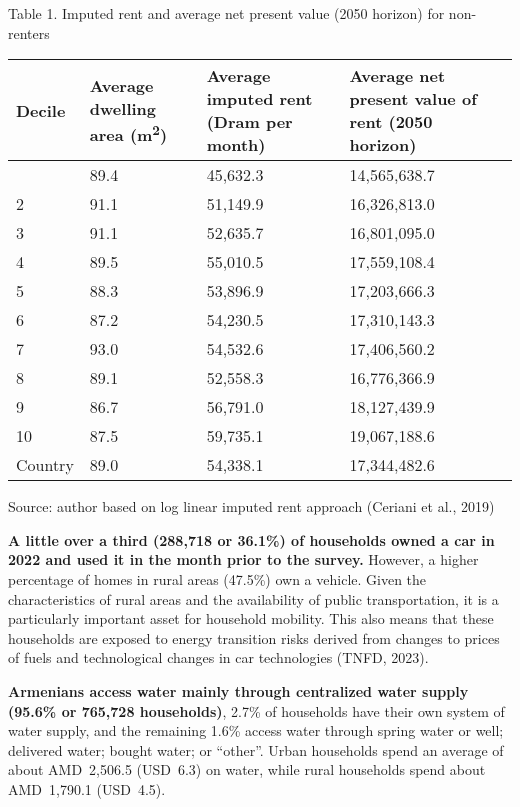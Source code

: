 \documentclass[
  letterpaper,
  DIV=11,
  numbers=noendperiod]{scrartcl}
\begin{document}
\label{_Ref100310659}{}Table 1. Imputed rent and average
net present value (2050 horizon) for non-renters

\begin{longtable}[]{@{}llll@{}}
\toprule\noalign{}
Decile & Average dwelling area (m\textsuperscript{2}) & Average imputed
rent (Dram per month) & Average net present value of rent (2050
horizon) \\
\midrule\noalign{}
\endhead
\bottomrule\noalign{}
\endlastfoot
1 & 89.4 & 45,632.3 & 14,565,638.7 \\
2 & 91.1 & 51,149.9 & 16,326,813.0 \\
3 & 91.1 & 52,635.7 & 16,801,095.0 \\
4 & 89.5 & 55,010.5 & 17,559,108.4 \\
5 & 88.3 & 53,896.9 & 17,203,666.3 \\
6 & 87.2 & 54,230.5 & 17,310,143.3 \\
7 & 93.0 & 54,532.6 & 17,406,560.2 \\
8 & 89.1 & 52,558.3 & 16,776,366.9 \\
9 & 86.7 & 56,791.0 & 18,127,439.9 \\
10 & 87.5 & 59,735.1 & 19,067,188.6 \\
Country & 89.0 & 54,338.1 & 17,344,482.6 \\
\end{longtable}

Source: author based on log linear imputed rent approach (Ceriani et
al., 2019)

\textbf{A little over a third (288,718 or 36.1\%) of households owned a
car in 2022 and used it in the month prior to the survey.} However, a
higher percentage of homes in rural areas (47.5\%) own a vehicle. Given
the characteristics of rural areas and the availability of public
transportation, it is a particularly important asset for household
mobility. This also means that these households are exposed to energy
transition risks derived from changes to prices of fuels and
technological changes in car technologies (TNFD, 2023).

\textbf{Armenians access water mainly through centralized water supply
(95.6\% or 765,728 households)}, 2.7\% of households have their own
system of water supply, and the remaining 1.6\% access water through
spring water or well; delivered water; bought water; or ``other''. Urban
households spend an average of about AMD~2,506.5 (USD~6.3) on water,
while rural households spend about AMD~1,790.1 (USD~4.5).
\end{document}
